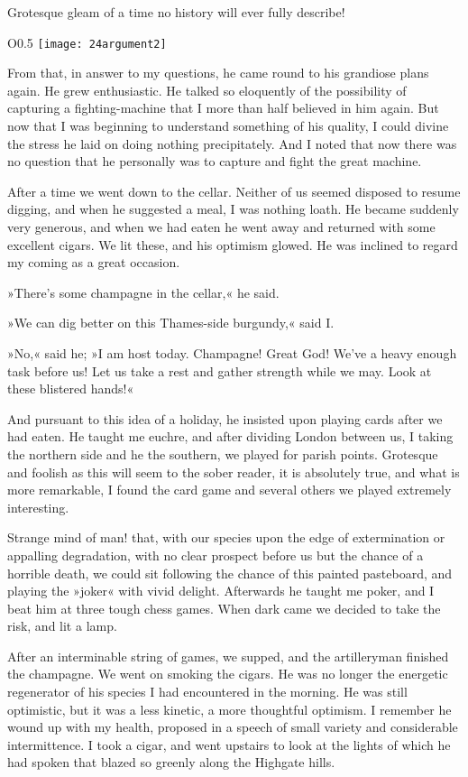 Grotesque gleam of a time no history will ever fully describe!

\begin{wrapfigure}{O}{0.5\textwidth}
\centering
\texttt{[image: 24argument2]}
\end{wrapfigure}

From that, in answer to my questions, he came round to his grandiose plans again. He grew enthusiastic. He talked so eloquently of the possibility of capturing a fighting-machine that I more than half believed in him again. But now that I was beginning to understand something of his quality, I could divine the stress he laid on doing nothing precipitately. And I noted that now there was no question that he personally was to capture and fight the great machine.

After a time we went down to the cellar. Neither of us seemed disposed to resume digging, and when he suggested a meal, I was nothing loath. He became suddenly very generous, and when we had eaten he went away and returned with some excellent cigars. We lit these, and his optimism glowed. He was inclined to regard my coming as a great occasion.

»There's some champagne in the cellar,« he said.

»We can dig better on this Thames-side burgundy,« said I.

»No,« said he; »I am host today. Champagne! Great God! We've a heavy enough task before us! Let us take a rest and gather strength while we may. Look at these blistered hands!«

And pursuant to this idea of a holiday, he insisted upon playing cards after we had eaten. He taught me euchre, and after dividing London between us, I taking the northern side and he the southern, we played for parish points. Grotesque and foolish as this will seem to the sober reader, it is absolutely true, and what is more remarkable, I found the card game and several others we played extremely interesting.



Strange mind of man! that, with our species upon the edge of extermination or appalling degradation, with no clear prospect before us but the chance of a horrible death, we could sit following the chance of this painted pasteboard, and playing the »joker« with vivid delight. Afterwards he taught me poker, and I beat him at three tough chess games. When dark came we decided to take the risk, and lit a lamp.

After an interminable string of games, we supped, and the artilleryman finished the champagne. We went on smoking the cigars. He was no longer the energetic regenerator of his species I had encountered in the morning. He was still optimistic, but it was a less kinetic, a more thoughtful optimism. I remember he wound up with my health, proposed in a speech of small variety and considerable intermittence. I took a cigar, and went upstairs to look at the lights of which he had spoken that blazed so greenly along the Highgate hills.

